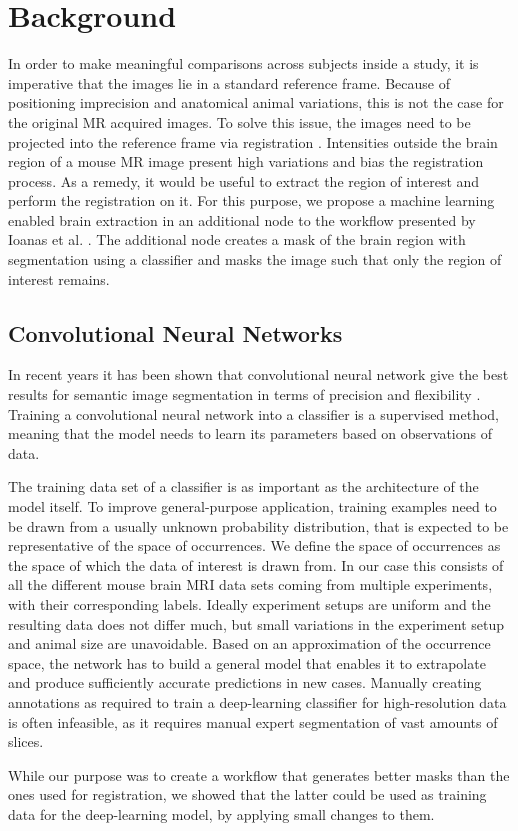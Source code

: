 \section{Background}
In order to make meaningful comparisons across subjects inside a study, it is imperative that the images lie in a standard reference frame.
Because of positioning imprecision and anatomical animal variations, this is not the case for the original MR acquired images.
To solve this issue, the images need to be projected into the reference frame via registration \cite{maintz_overview_nodate, sotiras_deformable_2013}. 
Intensities outside the brain region of a mouse MR image present high variations and bias the registration process.
As a remedy, it would be useful to extract the region of interest and perform the registration on it.
For this purpose, we propose a machine learning enabled brain extraction in an additional node to the workflow presented by Ioanas et al. \cite{ioanas_optimized_2019}.
The additional node creates a mask of the brain region with segmentation using a classifier and masks the image such that only the region of interest remains.


\subsection{Convolutional Neural Networks} \label{sec:Convolutional Neural Networks}
In recent years it has been shown that convolutional neural network give the best results for semantic image segmentation in terms of precision and flexibility \cite{geng_survey_2018} \cite{ronneberger_u-net:_2015}.
Training a convolutional neural network into a classifier is a supervised method, meaning that the model needs to learn its parameters based on observations of data.

The training data set of a classifier is as important as the architecture of the model itself.
To improve general-purpose application, training examples need to be drawn from a usually unknown probability distribution, that is expected to be representative of the space of occurrences.
We define the space of occurrences as the space of which the data of interest is drawn from.
In our case this consists of all the different mouse brain MRI data sets coming from multiple experiments, with their corresponding labels. 
Ideally experiment setups are uniform and the resulting data does not differ much, but small variations in the experiment setup and animal size are unavoidable.
Based on an approximation of the occurrence space, the network has to build a general model that enables it to extrapolate and produce sufficiently accurate predictions in new cases.
Manually creating annotations as required to train a deep-learning classifier for high-resolution data is often infeasible, as it requires manual expert segmentation of vast amounts of slices.

While our purpose was to create a workflow that generates better masks than the ones used for registration, we showed that the latter could be used as training data for the deep-learning model, by applying small changes to them.